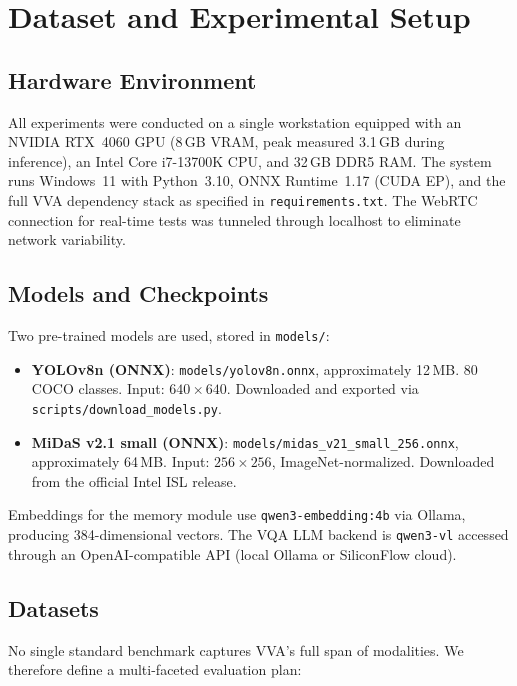 \section{Dataset and Experimental Setup}
\label{sec:experiments}

\subsection{Hardware Environment}

All experiments were conducted on a single workstation equipped with an NVIDIA RTX~4060 GPU (8\,GB VRAM, peak measured 3.1\,GB during inference), an Intel Core i7-13700K CPU, and 32\,GB DDR5 RAM. The system runs Windows~11 with Python~3.10, ONNX Runtime~1.17 (CUDA EP), and the full VVA dependency stack as specified in \texttt{requirements.txt}. The WebRTC connection for real-time tests was tunneled through localhost to eliminate network variability.

\subsection{Models and Checkpoints}

Two pre-trained models are used, stored in \texttt{models/}:

\begin{itemize}
    \item \textbf{YOLOv8n (ONNX)}: \texttt{models/yolov8n.onnx}, approximately 12\,MB. 80 COCO classes. Input: $640{\times}640$. Downloaded and exported via \texttt{scripts/download\_models.py}.
    \item \textbf{MiDaS v2.1 small (ONNX)}: \texttt{models/midas\_v21\_small\_256.onnx}, approximately 64\,MB. Input: $256{\times}256$, ImageNet-normalized. Downloaded from the official Intel ISL release.
\end{itemize}

Embeddings for the memory module use \texttt{qwen3-embedding:4b} via Ollama, producing 384-dimensional vectors. The VQA LLM backend is \texttt{qwen3-vl} accessed through an OpenAI-compatible API (local Ollama or SiliconFlow cloud).

\subsection{Datasets}

No single standard benchmark captures VVA's full span of modalities. We therefore define a multi-faceted evaluation plan:

